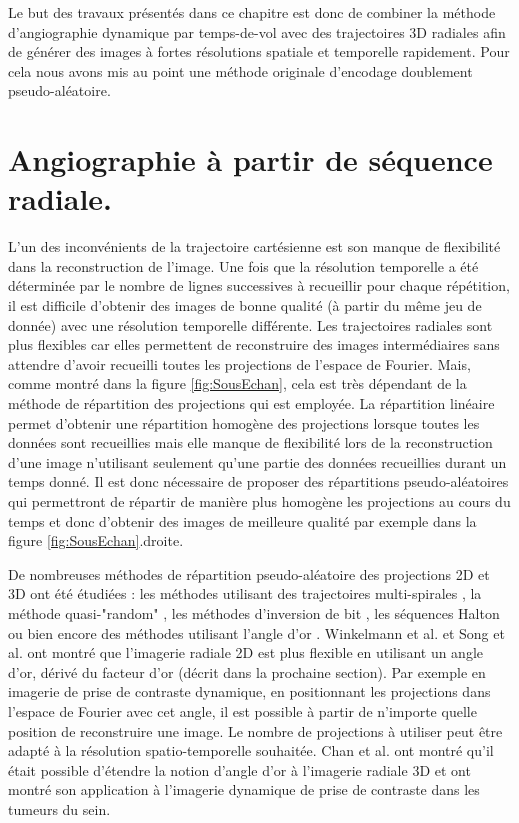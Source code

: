 Le but des travaux présentés dans ce chapitre est donc de combiner la méthode d’angiographie dynamique par temps-de-vol avec des trajectoires 3D radiales afin de générer des images à fortes résolutions spatiale et temporelle rapidement. Pour cela nous avons mis au point une méthode originale d’encodage doublement pseudo-aléatoire.


\section{Angiographie à partir de séquence radiale.}

L'un des inconvénients de la trajectoire cartésienne est son manque de flexibilité dans la reconstruction de l'image. Une fois que la résolution temporelle a été déterminée par le nombre de lignes successives à recueillir pour chaque répétition, il est difficile d'obtenir des images de bonne qualité (à partir du même jeu de donnée) avec une résolution temporelle différente.
Les trajectoires radiales sont plus flexibles car elles permettent de reconstruire des images intermédiaires sans attendre d'avoir recueilli toutes les projections de l'espace de Fourier. Mais, comme montré dans la figure \ref{fig:SousEchan}, cela est très dépendant de la méthode de répartition des projections qui est employée. La répartition linéaire permet d'obtenir une répartition homogène des projections lorsque toutes les données sont recueillies mais elle manque de flexibilité lors de la reconstruction d'une image n'utilisant seulement qu'une partie des données recueillies durant un temps donné. Il est donc nécessaire de proposer des répartitions pseudo-aléatoires qui permettront de répartir de manière plus homogène les projections au cours du temps et donc d'obtenir des images de meilleure qualité par exemple dans la figure \ref{fig:SousEchan}.droite.

De nombreuses méthodes de répartition pseudo-aléatoire des projections 2D et 3D ont été étudiées : les méthodes utilisant des trajectoires multi-spirales \cite{Chan:2009uq}, la méthode quasi-"random" \cite{Tibiletti2015Multistage-thre}, les méthodes d'inversion de bit \cite{Theilmann2004View-ordering-i}, les séquences Halton \cite{chan2009halton} ou bien encore des méthodes utilisant l'angle d'or \cite{Winkelmann:2007fk}. Winkelmann et al. \cite{Winkelmann:2007fk} et Song et al. \cite{Song:2000fk} ont montré que l'imagerie radiale 2D est plus flexible en utilisant un angle d'or, dérivé du facteur d'or (décrit dans la prochaine section). Par exemple en imagerie de prise de contraste dynamique, en positionnant les projections dans l'espace de Fourier avec cet angle, il est possible à partir de n'importe quelle position de reconstruire une image. Le nombre de projections à utiliser peut être adapté à la résolution spatio-temporelle souhaitée. Chan et al. \cite{Chan:2009uq} ont montré qu'il était possible d'étendre la notion d'angle d'or à l'imagerie radiale 3D et ont montré son application à l'imagerie dynamique de prise de contraste dans les tumeurs du sein.

